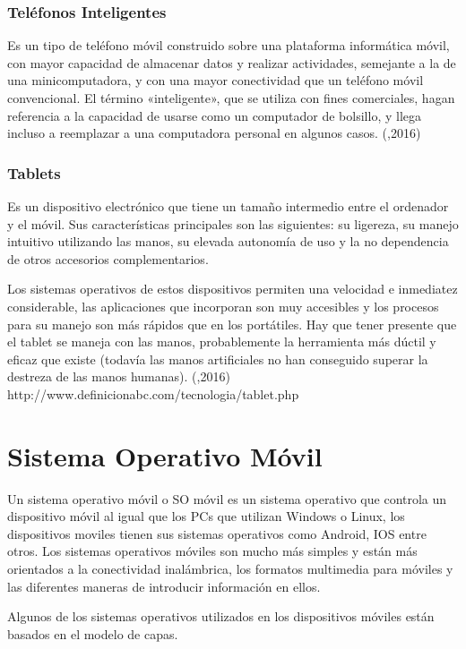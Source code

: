 \subsubsection{Teléfonos Inteligentes}
\setlength{\parskip}{5mm}
Es un tipo de teléfono móvil construido sobre una plataforma informática móvil, con mayor capacidad de almacenar datos y realizar actividades, semejante a la de una minicomputadora, y con una mayor conectividad que un teléfono móvil convencional. El término «inteligente», que se utiliza con fines comerciales, hagan referencia a la capacidad de usarse como un computador de bolsillo, y llega incluso a reemplazar a una computadora personal en algunos casos.
(\citet{},2016)
\setlength{\parskip}{0mm}
\subsubsection{Tablets}
\setlength{\parskip}{5mm}
Es un dispositivo electrónico que tiene un tamaño intermedio entre el ordenador y el móvil. Sus características principales son las siguientes: su ligereza, su manejo intuitivo utilizando las manos, su elevada autonomía de uso y la no dependencia de otros accesorios complementarios.

Los sistemas operativos de estos dispositivos permiten una velocidad e inmediatez considerable, las aplicaciones que incorporan son muy accesibles y los procesos para su manejo son más rápidos que en los portátiles. Hay que tener presente que el tablet se maneja con las manos, probablemente la herramienta más dúctil y eficaz que existe (todavía las manos artificiales no han conseguido superar la destreza de las manos humanas).
\setlength{\parskip}{0mm}
(\citet{tabletbib},2016)
http://www.definicionabc.com/tecnologia/tablet.php


\section{Sistema Operativo Móvil}	
\setlength{\parskip}{5mm}
Un sistema operativo móvil o SO móvil es un sistema operativo que controla un dispositivo móvil al igual que los PCs que utilizan Windows o Linux, los dispositivos moviles tienen sus sistemas operativos como Android, IOS entre otros. Los sistemas operativos móviles son mucho más simples y están más orientados a la conectividad inalámbrica, los formatos multimedia para móviles y las diferentes maneras de introducir información en ellos.

Algunos de los sistemas operativos utilizados en los dispositivos móviles están basados en el modelo de capas.

